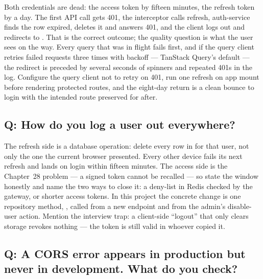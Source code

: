 Both credentials are dead: the access token by fifteen minutes, the
refresh token by a day. The first API call gets 401, the interceptor
calls refresh, auth-service finds the row expired, deletes it and
answers 401, and the client logs out and redirects to
. That is the correct outcome; the quality question is
what the user sees on the way. Every query that was in flight fails
first, and if the query client retries failed requests three times
with backoff --- TanStack Query's default --- the redirect is preceded
by several seconds of spinners and repeated 401s in the log. Configure
the query client not to retry on 401, run one refresh on app mount
before rendering protected routes, and the eight-day return is a clean
bounce to login with the intended route preserved for after.

\subsection*{Q: How do you log a user out everywhere?}

The refresh side is a database operation: delete every row in
 for that user, not only the one the current
browser presented. Every other device fails its next refresh and lands
on login within fifteen minutes. The access side is the Chapter~28
problem --- a signed token cannot be recalled --- so state the window
honestly and name the two ways to close it: a  deny-list in
Redis checked by the gateway, or shorter access tokens. In this project
the concrete change is one repository method,
, called from a new
 endpoint and from the admin's disable-user
action. Mention the interview trap: a client-side ``logout'' that only
clears storage revokes nothing --- the token is still valid in whoever
copied it.

\subsection*{Q: A CORS error appears in production but never in development. What do you check?}

